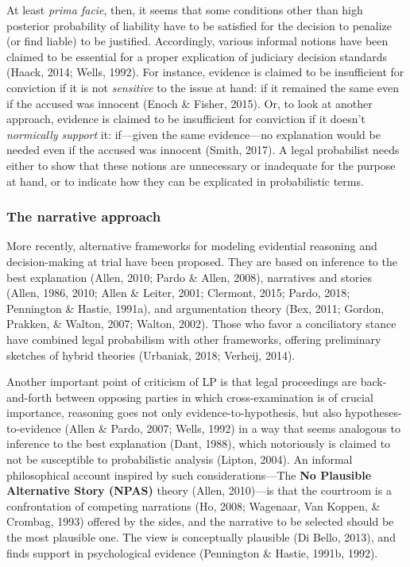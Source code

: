 \documentclass[11pt,dvipsnames,enabledeprecatedfontcommands]{scrartcl}
\begin{document}
At least \emph{prima facie}, then, it seems that some conditions other
than high posterior probability of liability have to be satisfied for
the decision to penalize (or find liable) to be justified. Accordingly,
various informal notions have been claimed to be essential for a proper
explication of judiciary decision standards (Haack, 2014; Wells, 1992).
For instance, evidence is claimed to be insufficient for conviction if
it is not \emph{sensitive} to the issue at hand: if it remained the same
even if the accused was innocent (Enoch \& Fisher, 2015). Or, to look at
another approach, evidence is claimed to be insufficient for conviction
if it doesn't \emph{normically support} it: if---given the same
evidence---no explanation would be needed even if the accused was
innocent (Smith, 2017). A legal probabilist needs either to show that
these notions are unnecessary or inadequate for the purpose at hand, or
to indicate how they can be explicated in probabilistic terms.

\hypertarget{the-narrative-approach}{%
\subsubsection{The narrative approach}\label{the-narrative-approach}}

More recently, alternative frameworks for modeling evidential reasoning
and decision-making at trial have been proposed. They are based on
inference to the best explanation (Allen, 2010; Pardo \& Allen, 2008),
narratives and stories (Allen, 1986, 2010; Allen \& Leiter, 2001;
Clermont, 2015; Pardo, 2018; Pennington \& Hastie, 1991a), and
argumentation theory (Bex, 2011; Gordon, Prakken, \& Walton, 2007;
Walton, 2002). Those who favor a conciliatory stance have combined legal
probabilism with other frameworks, offering preliminary sketches of
hybrid theories (Urbaniak, 2018; Verheij, 2014).

Another important point of criticism of LP is that legal proceedings are
back-and-forth between opposing parties in which cross-examination is of
crucial importance, reasoning goes not only evidence-to-hypothesis, but
also hypotheses-to-evidence (Allen \& Pardo, 2007; Wells, 1992) in a way
that seems analogous to inference to the best explanation (Dant, 1988),
which notoriously is claimed to not be susceptible to probabilistic
analysis (Lipton, 2004). An informal philosophical account inspired by
such considerations---The \textbf{No Plausible Alternative Story (NPAS)}
theory (Allen, 2010)---is that the courtroom is a confrontation of
competing narrations (Ho, 2008; Wagenaar, Van Koppen, \& Crombag, 1993)
offered by the sides, and the narrative to be selected should be the
most plausible one. The view is conceptually plausible (Di Bello, 2013),
and finds support in psychological evidence (Pennington \& Hastie,
1991b, 1992).
\end{document}
